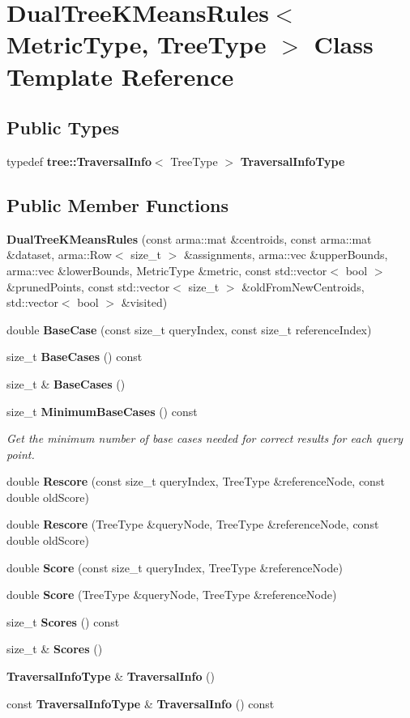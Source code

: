 \section{Dual\+Tree\+K\+Means\+Rules$<$ Metric\+Type, Tree\+Type $>$ Class Template Reference}
\label{classmlpack_1_1kmeans_1_1DualTreeKMeansRules}
\subsection*{Public Types}
\begin{DoxyCompactItemize}
\item 
typedef \textbf{ tree\+::\+Traversal\+Info}$<$ Tree\+Type $>$ \textbf{ Traversal\+Info\+Type}
\end{DoxyCompactItemize}
\subsection*{Public Member Functions}
\begin{DoxyCompactItemize}
\item 
\textbf{ Dual\+Tree\+K\+Means\+Rules} (const arma\+::mat \&centroids, const arma\+::mat \&dataset, arma\+::\+Row$<$ size\+\_\+t $>$ \&assignments, arma\+::vec \&upper\+Bounds, arma\+::vec \&lower\+Bounds, Metric\+Type \&metric, const std\+::vector$<$ bool $>$ \&pruned\+Points, const std\+::vector$<$ size\+\_\+t $>$ \&old\+From\+New\+Centroids, std\+::vector$<$ bool $>$ \&visited)
\item 
double \textbf{ Base\+Case} (const size\+\_\+t query\+Index, const size\+\_\+t reference\+Index)
\item 
size\+\_\+t \textbf{ Base\+Cases} () const
\item 
size\+\_\+t \& \textbf{ Base\+Cases} ()
\item 
size\+\_\+t \textbf{ Minimum\+Base\+Cases} () const
\begin{DoxyCompactList}\small\item\em Get the minimum number of base cases needed for correct results for each query point. \end{DoxyCompactList}\item 
double \textbf{ Rescore} (const size\+\_\+t query\+Index, Tree\+Type \&reference\+Node, const double old\+Score)
\item 
double \textbf{ Rescore} (Tree\+Type \&query\+Node, Tree\+Type \&reference\+Node, const double old\+Score)
\item 
double \textbf{ Score} (const size\+\_\+t query\+Index, Tree\+Type \&reference\+Node)
\item 
double \textbf{ Score} (Tree\+Type \&query\+Node, Tree\+Type \&reference\+Node)
\item 
size\+\_\+t \textbf{ Scores} () const
\item 
size\+\_\+t \& \textbf{ Scores} ()
\item 
\textbf{ Traversal\+Info\+Type} \& \textbf{ Traversal\+Info} ()
\item 
const \textbf{ Traversal\+Info\+Type} \& \textbf{ Traversal\+Info} () const
\end{DoxyCompactItemize}


